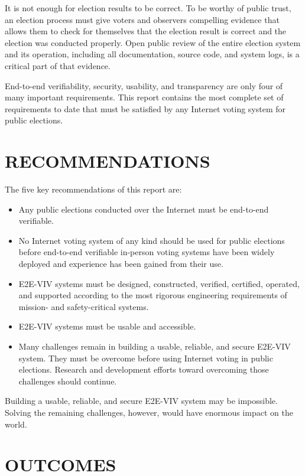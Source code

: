 It is not enough for election results to be correct. To be worthy of
public trust, an election process must give voters and observers
compelling evidence that allows them to check for themselves that the
election result is correct and the election was conducted
properly. Open public review of the entire election system and its
operation, including all documentation, source code, and system logs,
is a critical part of that evidence.

\vspace{1cm}

End-to-end verifiability, security, usability, and transparency are
only four of many important requirements. This report contains the
most complete set of requirements to date that must be satisfied by
any Internet voting system for public elections.

\newpage

\section*{RECOMMENDATIONS}

The five key recommendations of this report are:
\begin{itemize}
\item Any public elections conducted over the Internet must be
  end-to-end verifiable.
\item No Internet voting system of any kind should be used for public
  elections before end-to-end verifiable in-person voting systems have
  been widely deployed and experience has been gained from their use.
\item E2E-VIV systems must be designed, constructed, verified,
  certified, operated, and supported according to the most rigorous
  engineering requirements of mission- and safety-critical systems.
\item E2E-VIV systems must be usable and accessible.
\item Many challenges remain in building a usable, reliable, and
  secure E2E-VIV system. They must be overcome before using Internet
  voting in public elections. Research and development efforts toward
  overcoming those challenges should continue.
\end{itemize}

Building a usable, reliable, and secure E2E-VIV system may be
impossible. Solving the remaining challenges, however, would have
enormous impact on the world.

\section*{OUTCOMES}

